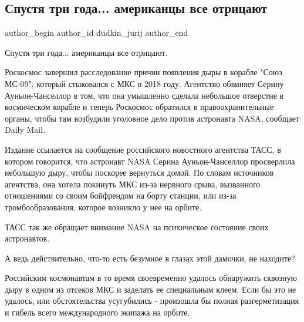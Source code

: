  
 
 
 
 
 
\subsection{Спустя три года... американцы все отрицают}
\label{sec:03_12_2021.fb.dudkin_jurij.1.kosmos}
 
\ifcmt
 author_begin
   author_id dudkin_jurij
 author_end
\fi

Спустя три года... американцы все отрицают.

Роскосмос завершил расследование причин появления дыры в корабле "Союз МС-09",
который стыковался с МКС в 2018 году. Агентство обвиняет Серину
Ауньон-Чанселлор в том, что она умышленно сделала небольшое отверстие в
космическом корабле и теперь Роскосмос обратился в правоохранительные органы,
чтобы там возбудили уголовное дело против астронавта NASA, сообщает Daily Mail.


Издание ссылается на сообщение российского новостного агентства ТАСС, в котором
говорится, что астронавт NASA Серина Ауньон-Чанселлор просверлила небольшую
дыру, чтобы поскорее вернуться домой. По словам источников агентства, она
хотела покинуть МКС из-за нервного срыва, вызванного отношениями со своим
бойфрендом на борту станции, или из-за тромбообразования, которое возникло у
нее на орбите. 

ТАСС так же обращает внимание NASA на психическое состояние своих астронавтов.

А ведь действительно, что-то есть безумное в глазах этой дамочки, не находите?

Российским космонавтам в то время своевременно удалось обнаружить сквозную дыру
в одном из отсеков МКС и заделать ее специальным клеем. Если бы это не удалось,
или обстоятельства усугубились - произошла бы полная  разгерметизация и гибель
всего международного экипажа на орбите.

